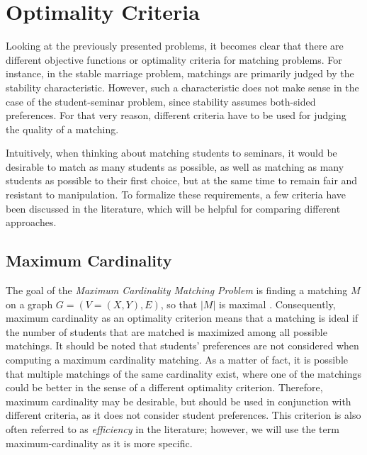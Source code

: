 \section{Optimality Criteria}\label{sec:optimality}
Looking at the previously presented problems, it becomes clear that there are different objective functions or optimality criteria for matching problems. For instance, in the stable marriage problem, matchings are primarily judged by the stability characteristic. However, such a characteristic does not make sense in the case of the student-seminar problem, since stability assumes both-sided preferences. For that very reason, different criteria have to be used for judging the quality of a matching.

Intuitively, when thinking about matching students to seminars, it would be desirable to match as many students as possible, as well as matching as many students as possible to their first choice, but at the same time to remain fair and resistant to manipulation. To formalize these requirements, a few criteria have been discussed in the literature, which will be helpful for comparing different approaches. 

\subsection{Maximum Cardinality}
The goal of the \emph{Maximum Cardinality Matching Problem} is finding a matching $M$ on a graph $G=(V=(X, Y), E)$, so that $|M|$ is maximal \cite{GraphTheoryIntro}. Consequently, maximum cardinality as an optimality criterion means that a matching is ideal if the number of students that are matched is maximized among all possible matchings. It should be noted that students' preferences are not considered when computing a maximum cardinality matching. As a matter of fact, it is possible that multiple matchings of the same cardinality exist, where one of the matchings could be better in the sense of a different optimality criterion. Therefore, maximum cardinality may be desirable, but should be used in conjunction with different criteria, as it does not consider student preferences. This criterion is also often referred to as \emph{efficiency} in the literature; however, we will use the term maximum-cardinality as it is more specific.

